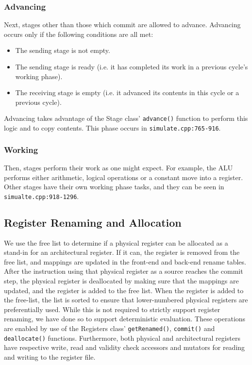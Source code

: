 \documentclass[12pt]{article}
\begin{document}
\subsubsection{Advancing}
Next, stages other than those which commit are allowed to advance.
Advancing occurs only if the following conditions are all met:
\begin{itemize}
  \item The sending stage is not empty.
  \item The sending stage is ready (i.e. it has completed its work in a previous cycle's working phase).
  \item The receiving stage is empty (i.e. it advanced its contents in this cycle or a previous cycle).
\end{itemize}
Advancing takes advantage of the Stage class' \texttt{advance()} function to perform this logic and to copy contents.
This phase occurs in \texttt{simulate.cpp:765-916}.

\subsubsection{Working}
Then, stages perform their work as one might expect. 
For example, the ALU performs either arithmetic, logical operations or a constant move into a register.
Other stages have their own working phase tasks, and they can be seen in \texttt{simualte.cpp:918-1296}.


\subsection{Register Renaming and Allocation}
\label{sec:renamealloc}
We use the free list to determine if a physical register can be allocated as a stand-in for an architectural register. 
If it can, the register is removed from the free list, and mappings are updated in the front-end and back-end rename tables. 
After the instruction using that physical register as a source reaches the commit step, the physical register is deallocated by making sure that the mappings are updated, and the register is added to the free list. 
When the register is added to the free-list, the list is sorted to ensure that lower-numbered physical registers are preferentially used.
While this is not required to strictly support register renaming, we have done so to support deterministic evaluation.
These operations are enabled by use of the Registers class' \texttt{getRenamed()}, \texttt{commit()} and \texttt{deallocate()} functions.
Furthermore, both physical and architectural registers have respective write, read and validity check accessors and mutators for reading and writing to the register file.
\end{document}
